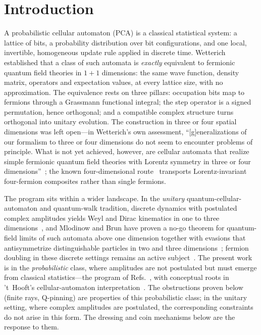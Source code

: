 \documentclass[aps,prd,twocolumn,superscriptaddress,nofootinbib,floatfix]{revtex4-2}
\begin{document}
\maketitle

\section{Introduction}
\label{sec:intro}

A probabilistic cellular automaton (PCA) is a classical statistical system:
a lattice of bits, a probability distribution over bit configurations, and
one local, invertible, homogeneous update rule applied in discrete time.
Wetterich~\cite{Wetterich2022,Wetterich2022b} established that a class of
such automata is \emph{exactly} equivalent to fermionic quantum field
theories in $1+1$ dimensions: the same wave function, density matrix,
operators and expectation values, at every lattice size, with no
approximation. The equivalence rests on three pillars: occupation bits map
to fermions through a Grassmann functional integral; the step operator is a
signed permutation, hence orthogonal; and a compatible complex structure
turns orthogonal into unitary evolution. The construction in three or four
spatial dimensions was left open---in Wetterich's own assessment,
``[g]eneralizations of our formalism to three or four dimensions do
not seem to encounter problems of principle. What is not yet achieved,
however, are cellular automata that realize simple fermionic quantum
field theories with Lorentz symmetry in three or four
dimensions''~\cite{Wetterich2022}; the known four-dimensional
route~\cite{Wetterich2022c} transports Lorentz-invariant four-fermion
composites rather than single fermions.

The program sits within a wider landscape. In the \emph{unitary}
quantum-cellular-automaton and quantum-walk tradition, discrete dynamics
with postulated complex amplitudes yields Weyl and Dirac kinematics in one
to three dimensions~\cite{BialynickiBirula,Meyer,DArianoPerinotti,
BisioDAriano,Arrighi,Farrelly,Kitagawa}, and Mlodinow and Brun have proven
a no-go theorem for quantum-field limits of such automata above one
dimension together with evasions that antisymmetrize distinguishable
particles in two and three dimensions~\cite{MlodinowBrunNoGo,BrunMlodinow2D,
MlodinowBrun3D}; fermion doubling in these discrete settings remains an
active subject~\cite{DoublingQW}. The present work is in the \emph{probabilistic} class, where amplitudes
are not postulated but must emerge from classical statistics---the program of
Refs.~\cite{Wetterich2021NPB,Wetterich2022,Wetterich2022b,WetterichPotential,
KreuzkampWetterich,Wetterich2025}, with conceptual roots in 't~Hooft's
cellular-automaton interpretation~\cite{tHooft}. The obstructions proven
below (finite rays, Q-pinning) are properties of this probabilistic
class; in the unitary setting, where complex amplitudes are postulated,
the corresponding constraints do not arise in this form. The dressing
and coin mechanisms below are the response to them.
\end{document}
